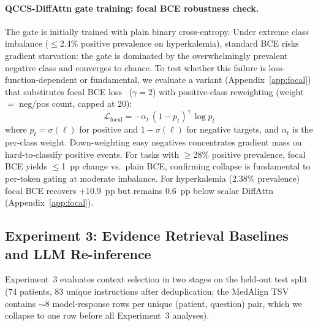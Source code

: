 \documentclass{article}
\begin{document}
\paragraph{QCCS-DiffAttn gate training: focal BCE robustness check.}
The gate is initially trained with plain binary cross-entropy. Under extreme
class imbalance ($\leq$2.4\% positive prevalence on hyperkalemia), standard BCE
risks gradient starvation: the gate is dominated by the overwhelmingly prevalent
negative class and converges to chance. To test whether this failure is
loss-function-dependent or fundamental, we evaluate a variant (Appendix~\ref{app:focal})
that substitutes focal BCE loss~\cite{lin2017focal} ($\gamma=2$) with
positive-class reweighting (weight $=$ neg/pos count, capped at 20):
\begin{equation}
  \mathcal{L}_{\mathrm{focal}} = -\alpha_t \,(1-p_t)^{\gamma}\,\log p_t
  \label{eq:focal}
\end{equation}
where $p_t = \sigma(\ell)$ for positive and $1-\sigma(\ell)$ for negative targets,
and $\alpha_t$ is the per-class weight. Down-weighting easy negatives concentrates
gradient mass on hard-to-classify positive events. For tasks with
$\geq$28\% positive prevalence, focal BCE yields $\leq$1~pp change vs.\ plain
BCE, confirming collapse is fundamental to per-token gating at moderate
imbalance. For hyperkalemia (2.38\% prevalence) focal BCE recovers +10.9~pp
but remains 0.6~pp below scalar DiffAttn (Appendix~\ref{app:focal}).

\subsection{Experiment 3: Evidence Retrieval Baselines and LLM Re-inference}
\label{sec:exp3}

Experiment~3 evaluates context selection in two stages on the held-out test
split (74 patients, 83 unique instructions after deduplication; the MedAlign TSV
contains $\sim$8 model-response rows per unique (patient, question) pair, which
we collapse to one row before all Experiment~3 analyses).
\end{document}
